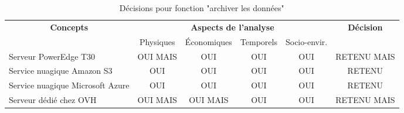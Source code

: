 

\begin{table}[!htbp]
	\begin{tabular}{|l|c|c|c|c|c|}
		\hline
		\multicolumn{1}{|c|}{\multirow{2}{*}{\textbf{Concepts}}} & \multicolumn{4}{c|}{\textbf{Aspects de l'analyse}} & \multirow{2}{*}{\textbf{Décision}} \\ \cline{2-5}
		\multicolumn{1}{|c|}{}                                   & Physiques & Économiques & Temporels & Socio-envir. &                                    \\ \hline
		Serveur PowerEdge T30                                                 & OUI MAIS       & OUI         & OUI       & OUI          & RETENU MAIS                             \\ \hline
		Service nuagique Amazon S3                                                 & OUI       & OUI         & OUI       & OUI          & RETENU                             \\ \hline
		Service nuagique Microsoft Azure                                                 & OUI       & OUI         & OUI       & OUI          & RETENU                             \\ \hline
		Serveur dédié chez OVH                                                & OUI MAIS      & OUI MAIS        & OUI       & OUI          & RETENU MAIS        \\ \hline
	\end{tabular}
	\caption{Décisions pour fonction "archiver les données"}
	\label{tab:fct_archiver}
\end{table}